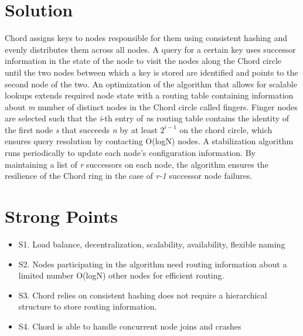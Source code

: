 \documentclass[10pt]{proc}
\begin{document}
\section{Solution}
Chord assigns keys to nodes responsible for them using consistent hashing and evenly distributes them across all nodes.
A query for a certain key uses successor information in the state of the node to visit the nodes along the Chord circle until the two nodes between which a key is stored are identified and points to the second node of the two. 
An optimization of the algorithm that allows for scalable lookups extends required node state with a routing table containing information about \emph{m} number of distinct nodes in the Chord circle called fingers. 
Finger nodes are selected such that the \emph{i}-th entry of \emph{n}s routing table contains the identity of the first node \emph{s} that succeeds \emph{n} by at least $2^{i-1}$ on the chord circle, which ensures query resolution by contacting O(logN) nodes.
A stabilization algorithm runs periodically to update each node's configuration information. 
By maintaining a list of \emph{r} successors on each node, the algorithm ensures the resilience of the Chord ring in the case of \emph{r-1} successor node failures. 

\section{Strong Points}
\begin{itemize}
 \item S1. Load balance, decentralization, scalability, availability, flexible naming
 \item S2. Nodes participating in the algorithm need routing information about a limited number O(logN) other nodes for efficient routing.
 \item S3. Chord relies on consistent hashing does not require a hierarchical structure to store routing information.
 \item S4. Chord is able to handle concurrent node joins and crashes
\end{itemize}
\end{document}
